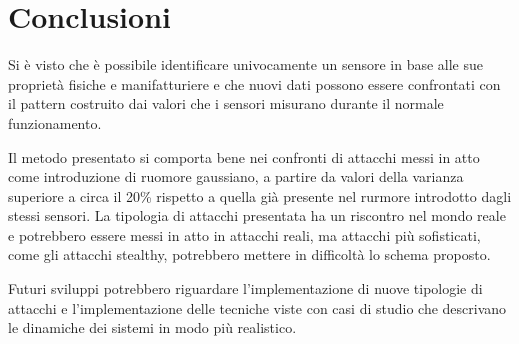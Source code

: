\documentclass[Lau,binding=0.6cm,noexaminfo]{sapthesis}
\begin{document}
\chapter{Conclusioni}\label{chap:6}
Si \`e visto che \`e possibile identificare univocamente un sensore in base alle sue propriet\`a fisiche e manifatturiere e che nuovi dati possono essere confrontati con il pattern costruito dai valori che i sensori misurano durante il normale funzionamento.

Il metodo presentato si comporta bene nei confronti di attacchi messi in atto come introduzione di ruomore gaussiano, a partire da valori della varianza superiore a circa il 20\% rispetto a quella gi\`a presente nel rurmore introdotto dagli stessi sensori.
La tipologia di attacchi presentata ha un riscontro nel mondo reale e potrebbero essere messi in atto in attacchi reali, ma attacchi pi\`u sofisticati, come gli attacchi stealthy, potrebbero mettere in difficolt\`a lo schema proposto.

Futuri sviluppi potrebbero riguardare l'implementazione di nuove tipologie di attacchi e l'implementazione delle tecniche viste con casi di studio che descrivano le dinamiche dei sistemi in modo pi\`u realistico.

\backmatter
\end{document}
